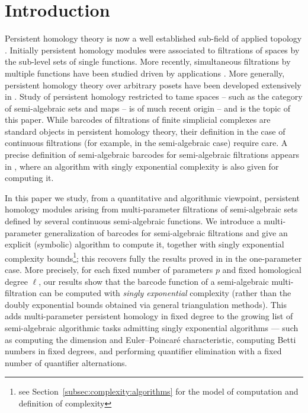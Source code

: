 \documentclass{amsart}[10pts]
\theoremstyle{definition}
\theoremstyle{remark}
\theoremstyle{observation}
\numberwithin{equation}{section}
\begin{document}
\tableofcontents


\section{Introduction}
Persistent homology theory is now a well established sub-field of applied topology \cite{Weinberger_survey,Ghrist,dey2022computational}. Initially persistent homology modules were associated to filtrations of spaces by the sub-level sets of single functions. More recently, simultaneous filtrations by multiple functions have been studied driven by applications \cite{CZ2007,CSZ2010,BOO2022,DX2022,DKM2024}. 
More generally, persistent homology theory over arbitrary posets have been developed
extensively in \cite{miller2020homological}.
Study of persistent homology restricted to tame spaces -- such 
as the category of semi-algebraic sets and maps -- is of much recent origin \cite{KS2018,Miller2023,Basu-Karisani-2} -- and is the topic of this paper.
While barcodes of filtrations of finite simplicial complexes are standard  objects in persistent homology theory, their definition in the case of continuous filtrations (for example, in the semi-algebraic case) require care. A precise definition 
of semi-algebraic barcodes for semi-algebraic filtrations appears in 
\cite{Basu-Karisani-2}, where an algorithm with singly exponential complexity is also given for computing it. 

\medskip
In this paper we study, from a quantitative and algorithmic viewpoint, persistent homology modules arising from multi-parameter filtrations of semi-algebraic sets defined by several continuous semi-algebraic functions. 
We introduce a multi-parameter generalization of barcodes for semi-algebraic filtrations and give an explicit (symbolic) algorithm 
to compute it, together with singly exponential complexity bounds\footnote{see Section~\ref{subsec:complexity:algorithms} for the model of computation and definition of complexity}; this recovers fully the results proved in \cite{Basu-Karisani-2} in the one-parameter case. 
More precisely, for each fixed number of parameters $p$
and fixed homological degree $\ell$,
our results show that the barcode function of a semi-algebraic multi-filtration can be computed with \emph{singly exponential} complexity (rather than the doubly exponential bounds obtained via general triangulation methods). This adds multi-parameter persistent homology in fixed degree to the growing list of semi-algebraic algorithmic tasks admitting singly exponential algorithms — such as computing the dimension and Euler–Poincar\'e characteristic, computing Betti numbers in fixed degrees, and performing quantifier elimination with a fixed number of quantifier alternations.
\end{document}
